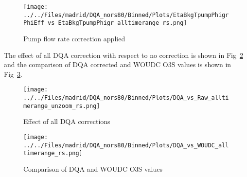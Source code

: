                         \begin{figure}
        \centering
\texttt{[image: ../../Files/madrid/DQA\_nors80/Binned/Plots/EtaBkgTpumpPhigrPhiEff\_vs\_EtaBkgTpumpPhigr\_alltimerange\_rs.png]}
    \caption{Pump flow rate correction applied}
            \label{fig:pf_eff}
    \end{figure}
%
%

The effect of all DQA correction with respect to no correction is shown in Fig~\ref{fig:dqa_all} and the comparison of DQA corrected and
WOUDC O3S values is shown in Fig~\ref{fig:fig_dqa_ndacc}.

                        \begin{figure}
        \centering
\texttt{[image: ../../Files/madrid/DQA\_nors80/Binned/Plots/DQA\_vs\_Raw\_alltimerange\_unzoom\_rs.png]}
    \caption{Effect of all DQA corrections}
            \label{fig:dqa_all}
    \end{figure}

                        \begin{figure}
        \centering
\texttt{[image: ../../Files/madrid/DQA\_nors80/Binned/Plots/DQA\_vs\_WOUDC\_alltimerange\_rs.png]}
    \caption{Comparison of DQA and WOUDC O3S values}
            \label{fig:fig_dqa_ndacc}
    \end{figure}


